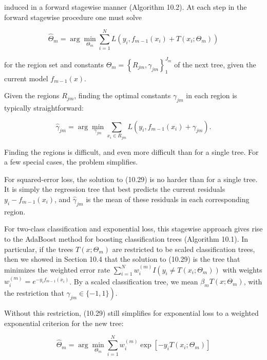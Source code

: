 \documentclass[10pt]{article}
\begin{document}
induced in a forward stagewise manner (Algorithm 10.2). At each step in the forward stagewise procedure one must solve


\begin{equation*}
\hat{\Theta}_{m}=\arg \min _{\Theta_{m}} \sum_{i=1}^{N} L\left(y_{i}, f_{m-1}\left(x_{i}\right)+T\left(x_{i} ; \Theta_{m}\right)\right) \tag{10.29}
\end{equation*}


for the region set and constants $\Theta_{m}=\left\{R_{j m}, \gamma_{j m}\right\}_{1}^{J_{m}}$ of the next tree, given the current model $f_{m-1}(x)$.

Given the regions $R_{j m}$, finding the optimal constants $\gamma_{j m}$ in each region is typically straightforward:


\begin{equation*}
\hat{\gamma}_{j m}=\arg \min _{\gamma_{j m}} \sum_{x_{i} \in R_{j m}} L\left(y_{i}, f_{m-1}\left(x_{i}\right)+\gamma_{j m}\right) . \tag{10.30}
\end{equation*}


Finding the regions is difficult, and even more difficult than for a single tree. For a few special cases, the problem simplifies.

For squared-error loss, the solution to (10.29) is no harder than for a single tree. It is simply the regression tree that best predicts the current residuals $y_{i}-f_{m-1}\left(x_{i}\right)$, and $\hat{\gamma}_{j m}$ is the mean of these residuals in each corresponding region.

For two-class classification and exponential loss, this stagewise approach gives rise to the AdaBoost method for boosting classification trees (Algorithm 10.1). In particular, if the trees $T\left(x ; \Theta_{m}\right)$ are restricted to be scaled classification trees, then we showed in Section 10.4 that the solution to (10.29) is the tree that minimizes the weighted error rate $\sum_{i=1}^{N} w_{i}^{(m)} I\left(y_{i} \neq\right. \left.T\left(x_{i} ; \Theta_{m}\right)\right)$ with weights $w_{i}^{(m)}=e^{-y_{i} f_{m-1}\left(x_{i}\right)}$. By a scaled classification tree, we mean $\beta_{m} T\left(x ; \Theta_{m}\right)$, with the restriction that $\left.\gamma_{j m} \in\{-1,1\}\right)$.

Without this restriction, (10.29) still simplifies for exponential loss to a weighted exponential criterion for the new tree:


\begin{equation*}
\hat{\Theta}_{m}=\arg \min _{\Theta_{m}} \sum_{i=1}^{N} w_{i}^{(m)} \exp \left[-y_{i} T\left(x_{i} ; \Theta_{m}\right)\right] \tag{10.31}
\end{equation*}
\end{document}
